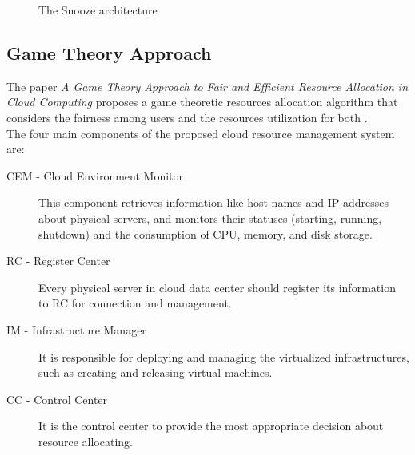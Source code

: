 \begin{figure}[!ht]
\label{fig:snooze_arch}
\caption{The Snooze architecture \cite{Feller:2012kf}}
\end{figure}

\subsection{Game Theory Approach}
\label{sec:sota_game_theroy}
The paper \textit{A Game Theory Approach to Fair and Efficient Resource Allocation in Cloud Computing} proposes a game theoretic resources allocation algorithm that considers the fairness among users and the resources utilization for both \cite{Xu:2014do}.\\
The four main components of the proposed cloud resource management system are:
\begin{description}
  \item[CEM - Cloud Environment Monitor] This component retrieves information like host names and IP addresses about physical servers, and monitors their statuses (starting, running, shutdown) and the consumption of CPU, memory, and disk storage.
  \item[RC - Register Center] Every physical server in cloud data center should register its information to RC for connection and management.
  \item[IM - Infrastructure Manager] It is responsible for deploying and managing the virtualized infrastructures, such as creating and releasing virtual machines.
  \item[CC - Control Center] It is the control center to provide the most appropriate decision about resource allocating.
\end{description}

